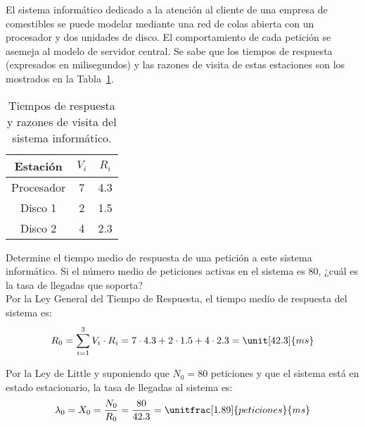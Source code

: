 \begin{comment}
\solucion
    \begin{itemize}
        \item $\lambda = 12.13$ peticiones/minuto
        \item $X = 11.97$ peticiones/minuto
        \item $U = 0.77$
        \item $S = 3.84$ segundos/petición
    \end{itemize}
\end{comment}

\begin{ejercicio}\label{ej:5.5}
    El sistema informático dedicado a la atención al cliente de una empresa de comestibles se puede modelar mediante una red de colas abierta con un procesador y dos unidades de disco. El comportamiento de cada petición se asemeja al modelo de servidor central. Se sabe que los tiempos de respuesta (expresados en milisegundos) y las razones de visita de estas estaciones son los mostrados en la Tabla~\ref{tab:5.5}.
    \begin{table}[h]
        \centering
        \begin{tabular}{|c|c|c|}
            \hline
            Estación & $V_i$ & $R_i$ \\
            \hline
            Procesador & 7 & 4.3 \\
            Disco 1 & 2 & 1.5 \\
            Disco 2 & 4 & 2.3 \\
            \hline
        \end{tabular}
        \caption{Tiempos de respuesta y razones de visita del sistema informático.}
        \label{tab:5.5}
    \end{table}
    Determine el tiempo medio de respuesta de una petición a este sistema informático. Si el número medio de peticiones activas en el sistema es 80, ¿cuál es la tasa de llegadas que soporta?\\

    Por la Ley General del Tiempo de Respuesta, el tiempo medio de respuesta del sistema es:
    \begin{equation*}
        R_0 = \sum_{i=1}^{3} V_i \cdot R_i = 7 \cdot 4.3 + 2 \cdot 1.5 + 4 \cdot 2.3 = \unit[42.3]{ms}
    \end{equation*}

    Por la Ley de Little y suponiendo que $N_0 = 80$ peticiones y que el sistema está en estado estacionario, la tasa de llegadas al sistema es:
    \begin{equation*}
        \lambda_0 = X_0 = \dfrac{N_0}{R_0} = \dfrac{80}{42.3} = \unitfrac[1.89]{peticiones}{ms}
    \end{equation*}
\end{ejercicio}
\begin{comment}
\solucion
    El tiempo de respuesta del sistema es $42.3$ ms y la tasa de llegadas es $1.89$ peticiones/ms.
\end{comment}

